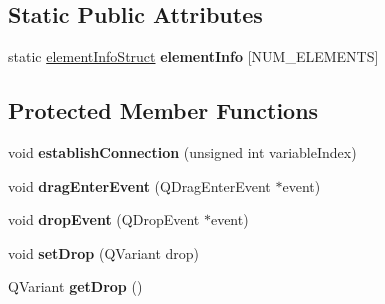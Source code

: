 \subsection*{Static Public Attributes}
\begin{DoxyCompactItemize}
\item 
\hypertarget{classQEPeriodic_abee7ebef76eba69520c649a9d6f4e0e0}{
static \hyperlink{structQEPeriodic_1_1elementInfoStruct}{elementInfoStruct} {\bfseries elementInfo} \mbox{[}NUM\_\-ELEMENTS\mbox{]}}
\label{classQEPeriodic_abee7ebef76eba69520c649a9d6f4e0e0}

\end{DoxyCompactItemize}
\subsection*{Protected Member Functions}
\begin{DoxyCompactItemize}
\item 
\hypertarget{classQEPeriodic_afbe6e8f93a2fb77fe98eaee78e87cc82}{
void {\bfseries establishConnection} (unsigned int variableIndex)}
\label{classQEPeriodic_afbe6e8f93a2fb77fe98eaee78e87cc82}

\item 
\hypertarget{classQEPeriodic_af185269c2c500069f4a64e325613f8ed}{
void {\bfseries dragEnterEvent} (QDragEnterEvent $\ast$event)}
\label{classQEPeriodic_af185269c2c500069f4a64e325613f8ed}

\item 
\hypertarget{classQEPeriodic_a31405c62d972f22d25bae072b396f1ed}{
void {\bfseries dropEvent} (QDropEvent $\ast$event)}
\label{classQEPeriodic_a31405c62d972f22d25bae072b396f1ed}

\item 
\hypertarget{classQEPeriodic_a6e25d6f443251c632baa86b8fa0436ad}{
void {\bfseries setDrop} (QVariant drop)}
\label{classQEPeriodic_a6e25d6f443251c632baa86b8fa0436ad}

\item 
\hypertarget{classQEPeriodic_a91903722bd51e962634bf3965fc1bfad}{
QVariant {\bfseries getDrop} ()}
\label{classQEPeriodic_a91903722bd51e962634bf3965fc1bfad}

\end{DoxyCompactItemize}
